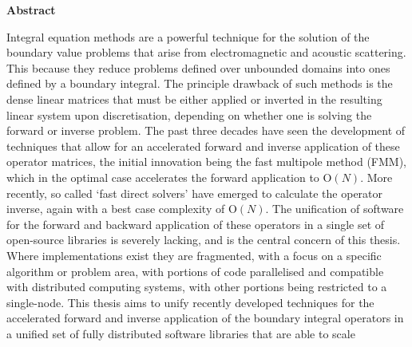\thispagestyle{plain}

\begin{center}
    \textbf{Abstract}
\end{center}

Integral equation methods are a powerful technique for the solution of the boundary value problems that arise from electromagnetic and acoustic scattering. This because they reduce problems defined over unbounded domains into ones defined by a boundary integral. The principle drawback of such methods is the dense linear matrices that must be either applied or inverted in the resulting linear system upon discretisation, depending on whether one is solving the forward or inverse problem. The past three decades have seen the development of techniques that allow for an accelerated forward and inverse application of these operator matrices, the initial innovation being the fast multipole method (FMM), which in the optimal case accelerates the forward application to $\text{O}(N)$. More recently, so called `fast direct solvers' have emerged to calculate the operator inverse, again with a best case complexity of $\text{O}(N)$. The unification of software for the forward and backward application of these operators in a single set of open-source libraries is severely lacking, and is the central concern of this thesis. Where implementations exist they are fragmented, with a focus on a specific  algorithm or problem area, with portions of code parallelised and compatible with distributed computing systems, with other portions being restricted to a single-node. This thesis aims to unify recently developed techniques for the accelerated forward and inverse application of the boundary integral operators in a unified set of fully distributed software libraries that are able to scale
